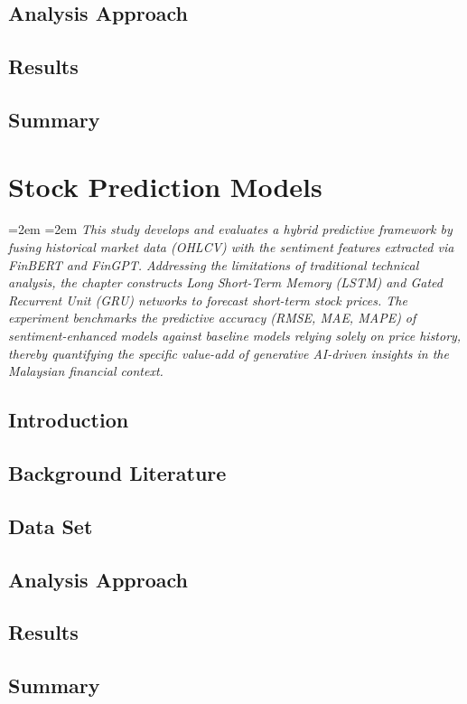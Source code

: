 \documentclass[singlespace]{ucetd}
\newcommand{\chapterabstract}[1]{%
  \par\vspace{1em}
  \begingroup
  \leftskip=2em
  \rightskip=2em
  \noindent\itshape
  #1
  \par
  \endgroup
  \vspace{1.5em}
}
\begin{document}
\section{Analysis Approach}
\section{Results}
\section{Summary}




\chapter{Stock Prediction Models}

\chapterabstract{This study develops and evaluates a hybrid predictive framework by fusing historical market data (OHLCV) with the sentiment features extracted via FinBERT and FinGPT. Addressing the limitations of traditional technical analysis, the chapter constructs Long Short-Term Memory (LSTM) and Gated Recurrent Unit (GRU) networks to forecast short-term stock prices. The experiment benchmarks the predictive accuracy (RMSE, MAE, MAPE) of sentiment-enhanced models against baseline models relying solely on price history, thereby quantifying the specific value-add of generative AI-driven insights in the Malaysian financial context.}

\section{Introduction}
\section{Background Literature}
\section{Data Set}
\section{Analysis Approach}
\section{Results}
\section{Summary}
\end{document}
